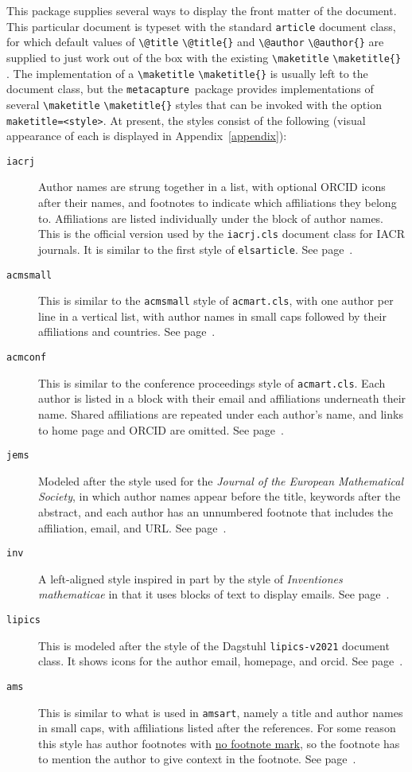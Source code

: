 \documentclass{article}
\newcommand{\pkgname}{\texttt{metacapture}}
\newcommand{\cmd}[2][]{%
  \def\FirstArg{#1}%
  \ifx\FirstArg\empty%
    \texttt{\textbackslash{}#2}%
  \else%
    \texttt{\textbackslash{}#2\{#1\}}%
  \fi
}
\begin{document}
This package supplies several ways to display the front matter of the document.
This particular document is typeset with the standard \texttt{article} document
class, for which default values of \cmd{@title} and \cmd{@author} are supplied to just
work out of the box with the existing \cmd{maketitle}. The
implementation of a \cmd{maketitle} is usually left to the document
class, but the \pkgname\ package provides implementations of
several \cmd{maketitle} styles that can be invoked with the option
\texttt{maketitle=\textless{style}\textgreater}. 
At present, the styles consist of the following (visual appearance
of each is displayed in Appendix~\ref{appendix}):
\begin{description}
\item[\texttt{iacrj}] Author names are strung together in a list, with
optional ORCID icons after their names, and footnotes to indicate
which affiliations they belong to. Affiliations are listed
individually under the block of author names.  This is the official
version used by the \texttt{iacrj.cls} document class for IACR
journals. It is similar to the first style of \texttt{elsarticle}. See page~\pageref{iacrj}.
\item[\texttt{acmsmall}] This is similar to the \texttt{acmsmall} style of \texttt{acmart.cls},
with one author per line in a vertical list, with author names in small caps followed
by their affiliations and countries. See page~\pageref{acmsmall}.
\item[\texttt{acmconf}] This is similar to the conference proceedings style
of \texttt{acmart.cls}. Each author is listed in a block with their email and
affiliations underneath their name. Shared affiliations are repeated under each author's name,
and links to home page and ORCID are omitted.
See page~\pageref{acmconf}.
\item[\texttt{jems}] Modeled after the style used for the {\em Journal of the European Mathematical Society},
in which author names appear before the title, keywords after the
abstract, and each author has an unnumbered footnote that includes the
affiliation, email, and URL. See page~\pageref{jems}.
\item[\texttt{inv}] A left-aligned style inspired in part by the style
of {\em Inventiones mathematicae} in that it uses blocks of text to display
emails. See page~\pageref{inv}.
\item[\texttt{lipics}] This is modeled after the style of the Dagstuhl \texttt{lipics-v2021} document
class. It shows icons for the author email, homepage, and orcid. See page~\pageref{lipics}.
\item[\texttt{ams}] This is similar to what is used in \texttt{amsart}, namely
a title and author names in small caps, with affiliations listed after
the references. For some reason this style has author footnotes
with \href{https://ctan.math.washington.edu/tex-archive/info/amscls-doc/Author_Handbook_Journals.pdf}{no
footnote mark}, so the footnote has to mention the author to give
context in the footnote. See page~\pageref{ams}.
\end{description}
\end{document}
